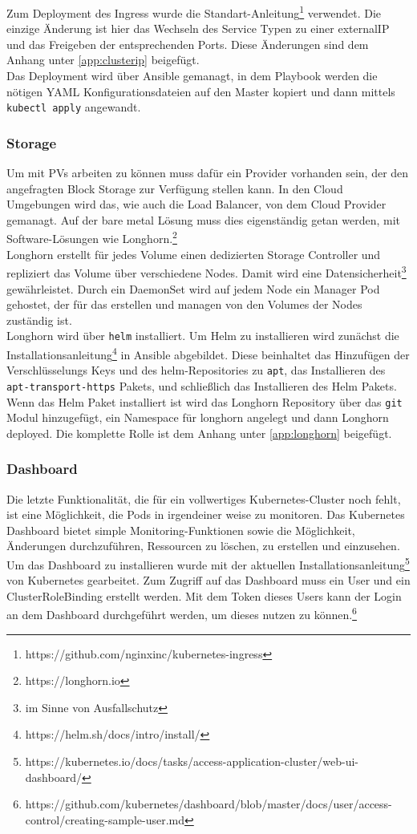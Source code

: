 Zum Deployment des Ingress wurde die Standart-Anleitung\footnote{https://github.com/nginxinc/kubernetes-ingress} verwendet.
Die einzige Änderung ist hier das Wechseln des Service Typen zu einer externalIP und das Freigeben der entsprechenden Ports.
Diese Änderungen sind dem Anhang unter \ref{app:clusterip} beigefügt.
\\
Das Deployment wird über Ansible gemanagt, in dem Playbook werden die nötigen \ac{YAML} Konfigurationsdateien auf den Master kopiert und dann mittels \texttt{kubectl apply} angewandt. 


\subsubsection{Storage}
Um mit \ac{PV}s arbeiten zu können muss dafür ein Provider vorhanden sein, der den angefragten Block Storage zur Verfügung stellen kann. 
In den Cloud Umgebungen wird das, wie auch die Load Balancer, von dem Cloud Provider gemanagt. 
Auf der bare metal Lösung muss dies eigenständig getan werden, mit Software-Lösungen wie Longhorn.\footnote{https://longhorn.io} \\
Longhorn erstellt für jedes Volume einen dedizierten Storage Controller und repliziert das Volume über verschiedene Nodes.
Damit wird eine Datensicherheit\footnote{im Sinne von Ausfallschutz} gewährleistet.
Durch ein DaemonSet wird auf jedem Node ein Manager Pod gehostet, der für das erstellen und managen von den Volumes der Nodes zuständig ist. 
\\
Longhorn wird über \texttt{helm} installiert. 
Um Helm zu installieren wird zunächst die Installationsanleitung\footnote{https://helm.sh/docs/intro/install/} in Ansible abgebildet.
Diese beinhaltet das Hinzufügen der Verschlüsselungs Keys und des helm-Repositories zu \texttt{apt}, das Installieren des \texttt{apt-transport-https} Pakets, und schließlich das Installieren des Helm Pakets.
\\
Wenn das Helm Paket installiert ist wird das Longhorn Repository über das \texttt{git} Modul hinzugefügt, ein Namespace für longhorn angelegt und dann Longhorn deployed.
Die komplette Rolle ist dem Anhang unter \ref{app:longhorn} beigefügt.

\subsubsection{Dashboard}
Die letzte Funktionalität, die für ein vollwertiges Kubernetes-Cluster noch fehlt, ist eine Möglichkeit, die Pods in irgendeiner weise zu monitoren.
Das Kubernetes Dashboard bietet simple Monitoring-Funktionen sowie die Möglichkeit, Änderungen durchzuführen, Ressourcen zu löschen, zu erstellen und einzusehen.
Um das Dashboard zu installieren wurde mit der aktuellen Installationsanleitung\footnote{https://kubernetes.io/docs/tasks/access-application-cluster/web-ui-dashboard/} von Kubernetes gearbeitet.
Zum Zugriff auf das Dashboard muss ein User und ein ClusterRoleBinding erstellt werden. 
Mit dem Token dieses Users kann der Login an dem Dashboard durchgeführt werden, um dieses nutzen zu können.\footnote{https://github.com/kubernetes/dashboard/blob/master/docs/user/access-control/creating-sample-user.md}
